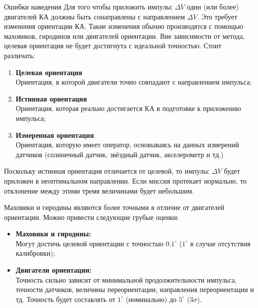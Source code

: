 \documentclass[8pt]{beamer}
\begin{document}
\begin{frame}{Ошибки наведения}
Для того чтобы приложить импульс $\Delta V$ один (или более) двигателей КА должны быть сонаправлены с направлением $\Delta V$. Это требует изменения ориентации КА. Такие изменения обычно производятся с помощью маховиков, гиродинов или двигателей ориентации. Вне зависимости от метода, целевая ориентация не будет достигнута с идеальной точностью. Стоит различать:
\begin{enumerate}
    \item \textbf{Целевая ориентация} \\
    Ориентация, в которой двигатели точно совпадают с направлением импульса;

    \item \textbf{Истинная ориентация} \\
    Ориентация, которая реально достигается КА в подготовке к приложению импульса;

    \item \textbf{Измеренная ориентация} \\
    Ориентация, которую имеет оператор, основываясь на данных измерений датчиков (солннечный датчик, звёздный датчик, акселерометр и тд.)
\end{enumerate}

Поскольку истинная ориентация отличается от целевой, то импульс $\Delta V$ будет приложен в неоптимальном направлении. Если миссия протекает нормально, то отклонение между этими тремя величинами будет небольшим. 

Маховики и гиродины являются более точными в отличие от двигателей ориентации. Можно привести следующие грубые оценки:
\begin{itemize}
    \item \textbf{Маховики и гиродины:} \\
    Могут достичь целевой ориентации с точностью $0.1^\circ$ ($1^\circ$ в случае отсутствия калибровки);

    \item \textbf{Двигатели ориентации:} \\
    Точность сильно зависит от минимальной продолжительности импульса, точности датчиков, величины переориентации, направления переориентации и тд. Точность будет составлять от $1^\circ$ (номинально) до $5^\circ$ ($3 \sigma$).
\end{itemize}
\end{frame}
\end{document}
